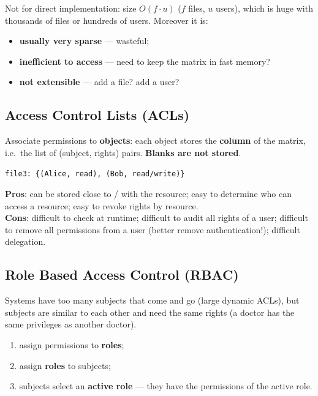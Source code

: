 \begin{warnbox}[title=The matrix is an abstract concept]
Not for direct implementation: size $O(f \cdot u)$ ($f$ files, $u$ users), which is huge
with thousands of files or hundreds of users. Moreover it is:
\begin{itemize}
  \item \textbf{usually very sparse} --- wasteful;
  \item \textbf{inefficient to access} --- need to keep the matrix in fast memory?
  \item \textbf{not extensible} --- add a file? add a user?
\end{itemize}
\end{warnbox}

\subsection{Access Control Lists (ACLs)}

\begin{defnbox}[title=Access Control List (ACL)]
Associate permissions to \textbf{objects}: each object stores the \textbf{column} of the
matrix, i.e.\ the list of (subject, rights) pairs. \textbf{Blanks are not stored}.
\begin{center}
\texttt{file3: \{(Alice, read), (Bob, read/write)\}}
\end{center}
\end{defnbox}

\begin{propbox}[title=ACLs: pros and cons]
\textbf{Pros}: can be stored close to / with the resource; easy to determine who can
access a resource; easy to revoke rights by resource. \\
\textbf{Cons}: difficult to check at runtime; difficult to audit all rights of a user;
difficult to remove all permissions from a user (better remove authentication!);
difficult delegation.
\end{propbox}

\subsection{Role Based Access Control (RBAC)}

\begin{defnbox}[title=Role Based Access Control (RBAC)]
Systems have too many subjects that come and go (large dynamic ACLs), but subjects are
similar to each other and need the same rights (a doctor has the same privileges as
another doctor).
\begin{enumerate}
  \item assign permissions to \textbf{roles};
  \item assign \textbf{roles} to subjects;
  \item subjects select an \textbf{active role} --- they have the permissions of the
        active role.
\end{enumerate}
\end{defnbox}

